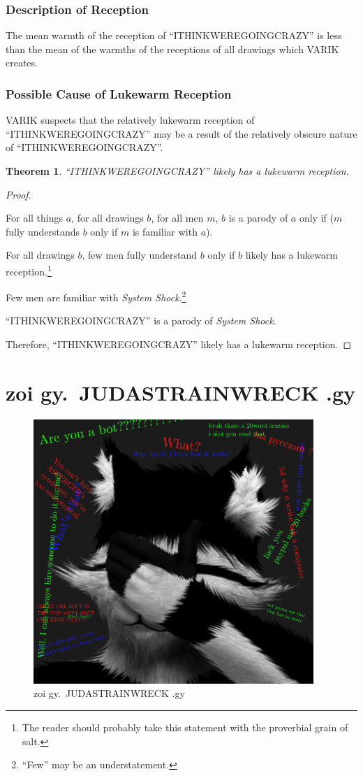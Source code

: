 \documentclass{report}
\newtheorem{thm}{Theorem}
\begin{document}
\subsection{Description of Reception}
The mean warmth of the reception of ``ITHINKWEREGOINGCRAZY'' is less than the mean of the warmths of the receptions of all drawings which VARIK creates.
\subsection{Possible Cause of Lukewarm Reception}
VARIK suspects that the relatively lukewarm reception of ``ITHINKWEREGOINGCRAZY'' may be a result of the relatively obscure nature of ``ITHINKWEREGOINGCRAZY''.
\begin{thm}
``ITHINKWEREGOINGCRAZY'' likely has a lukewarm reception.
\end{thm}
\begin{proof}
${}$

For all things $a$, for all drawings $b$, for all men $m$, $b$ is a parody of $a$ only if ($m$ fully understands $b$ only if $m$ is familiar with $a$).

For all drawings $b$, few men fully understand $b$ only if $b$ likely has a lukewarm reception.\footnote{The reader should probably take this statement with the proverbial grain of salt.}

Few men are familiar with \textit{System Shock}.\footnote{``Few'' may be an understatement.}

``ITHINKWEREGOINGCRAZY'' is a parody of \textit{System Shock}.

Therefore, ``ITHINKWEREGOINGCRAZY'' likely has a lukewarm reception.
\end{proof}
\chapter{zoi gy.\ JUDASTRAINWRECK .gy}
\begin{figure}[ht]
	\centering
	\includegraphics[height=10cm]{judastrainwreck/judastrainwreck.png}
	\caption[center]{zoi gy.\ JUDASTRAINWRECK .gy}
\end{figure}
\end{document}
